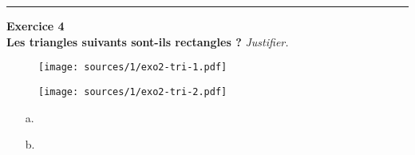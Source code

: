 \documentclass[12pt]{article}
\newcommand{\horrule}[1]{\rule{\linewidth}{#1}} %
\newcommand{\Pointille}[1][3]{\multido{}{#1}{    \makebox[\linewidth]{\dotfill}\\[\parskip]}}
\begin{document}
\horrule{1px}

\begin{multicols}{3}

  \textbf{Exercice 4}\\
  \textbf{Les triangles suivants sont-ils rectangles ?} \textit{Justifier.}
  
  \begin{figure}[H]
    \centering
    \texttt{[image: sources/1/exo2-tri-1.pdf]}
  \end{figure}

  \begin{figure}[H]
    \centering
    \texttt{[image: sources/1/exo2-tri-2.pdf]}
  \end{figure}
\end{multicols}

\begin{multicols}{2}
\begin{enumerate}
\item[a.] \Pointille[6]
\item[b.] \Pointille[6]
\end{enumerate}
\end{multicols}
\end{document}
